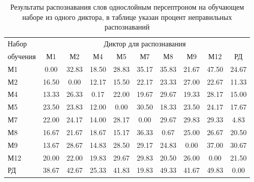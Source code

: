 \begin{table}[h]
	\centering
	\caption{Результаты распознавания слов однослойным персептроном на обучающем наборе из одного диктора, в таблице указан процент неправильных распознаваний}
	\label{tab:mlp1_dictor1}
	\begin{tabular}{| l | c | c | c | c | c | c | c | c | c |}
		\hline
		Набор & \multicolumn{9}{c|}{Диктор для распознавания} \\
		\hhline{~---------}
		обучения \phantom{0000} & М1    & М2    & М4    & М5    & М7    & М8    & М9    & М12   & РД \\
		\hline
		М1		 &  0.00 & 32.83 & 18.50 & 28.83 & 35.17 & 35.83 & 21.67 & 47.50 & 24.67 \\
		М2		 & 16.50 &  0.00 & 12.17 & 15.50 & 22.17 & 23.33 & 27.00 & 22.67 & 11.33 \\
		М4		 & 13.33 & 26.33 &  0.17 & 22.00 & 19.67 & 29.67 & 19.33 & 28.17 & 15.00 \\
		М5		 & 23.50 & 23.83 & 12.00 &  0.00 & 30.50 & 18.33 & 23.50 & 24.17 & 17.67 \\
		М7		 & 22.00 & 24.17 & 14.00 & 28.17 &  0.00 & 29.67 & 29.83 & 29.33 &  4.83 \\
		М8		 & 16.67 & 21.67 & 18.67 & 15.17 & 36.33 &  0.67 & 25.00 & 26.67 & 20.50 \\
		М9		 & 13.67 & 28.67 & 14.83 & 28.50 & 29.17 & 24.83 &  0.00 & 37.00 & 30.67 \\
		М12		 & 20.00 & 22.00 & 19.83 & 29.67 & 29.83 & 20.50 & 26.00 &  0.00 & 21.50 \\
		РД		 & 38.67 & 42.67 & 25.33 & 41.83 & 19.83 & 49.33 & 41.67 & 49.83 &  0.00 \\
		\hline
	\end{tabular}
\end{table}

